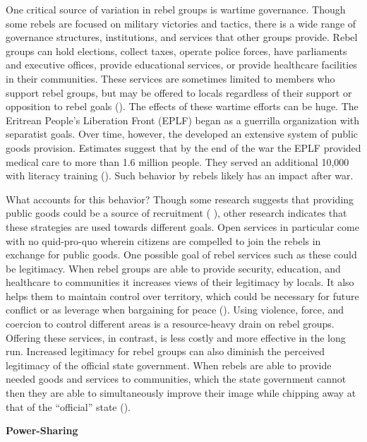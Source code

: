 \documentclass[12pt,]{article}
\begin{document}
One critical source of variation in rebel groups is wartime governance.
Though some rebels are focused on military victories and tactics, there
is a wide range of governance structures, institutions, and services
that other groups provide. Rebel groups can hold elections, collect
taxes, operate police forces, have parliaments and executive offices,
provide educational services, or provide healthcare facilities in their
communities. These services are sometimes limited to members who support
rebel groups, but may be offered to locals regardless of their support
or opposition to rebel goals (\citet{huang_wartime_2016}). The effects
of these wartime efforts can be huge. The Eritrean People's Liberation
Front (EPLF) began as a guerrilla organization with separatist goals.
Over time, however, the developed an extensive system of public goods
provision. Estimates suggest that by the end of the war the EPLF
provided medical care to more than 1.6 million people. They served an
additional 10,000 with literacy training (\citet{stewart_civil_2018}).
Such behavior by rebels likely has an impact after war.

What accounts for this behavior? Though some research suggests that
providing public goods could be a source of recruitment (
\citet{berman_religion_2008}), other research indicates that these
strategies are used towards different goals. Open services in particular
come with no quid-pro-quo wherein citizens are compelled to join the
rebels in exchange for public goods. One possible goal of rebel services
such as these could be legitimacy. When rebel groups are able to provide
security, education, and healthcare to communities it increases views of
their legitimacy by locals. It also helps them to maintain control over
territory, which could be necessary for future conflict or as leverage
when bargaining for peace (\citet{terpstra_rebel_2017}). Using violence,
force, and coercion to control different areas is a resource-heavy drain
on rebel groups. Offering these services, in contrast, is less costly
and more effective in the long run. Increased legitimacy for rebel
groups can also diminish the perceived legitimacy of the official state
government. When rebels are able to provide needed goods and services to
communities, which the state government cannot then they are able to
simultaneously improve their image while chipping away at that of the
``official'' state (\citet{terpstra_rebel_2017}).

\textbf{Power-Sharing}
\end{document}
